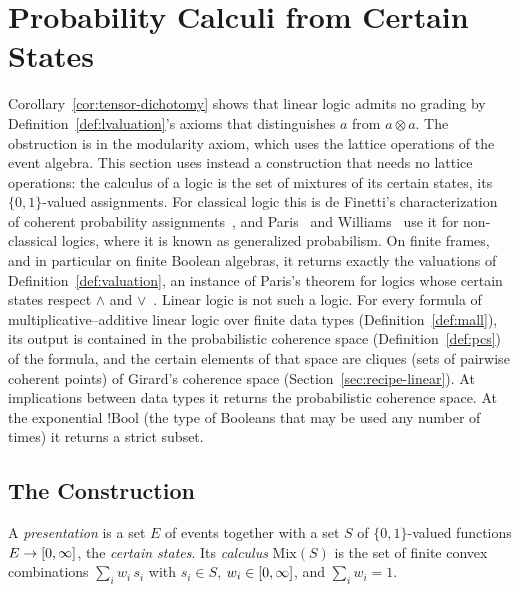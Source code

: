\section{Probability Calculi from Certain States}
\label{sec:recipe}

Corollary~\ref{cor:tensor-dichotomy} shows that linear logic admits no
grading by Definition~\ref{def:lvaluation}'s axioms that distinguishes
$a$ from $a \otimes a$. The obstruction is in the modularity axiom, which
uses the lattice operations of the event algebra. This section uses
instead a construction that needs no lattice operations: the calculus of
a logic is the set of mixtures of its certain states, its
$\{0,1\}$-valued assignments. For classical logic this is de Finetti's
characterization of coherent probability
assignments~\cite{definetti1974}, and Paris~\cite{paris2001} and
Williams~\cite{williams2012} use it for non-classical logics, where it is
known as generalized probabilism. On finite frames, and in particular on
finite Boolean algebras, it returns exactly the valuations of
Definition~\ref{def:valuation}, an instance of Paris's theorem for logics
whose certain states respect $\wedge$ and $\vee$~\cite{paris2001}.
Linear logic is not such a logic. For every formula of
multiplicative--additive linear logic over finite data types
(Definition~\ref{def:mall}), its output is contained in the
probabilistic coherence space (Definition~\ref{def:pcs}) of the formula,
and the certain elements of that space are cliques (sets of pairwise
coherent points) of Girard's coherence space
(Section~\ref{sec:recipe-linear}). At implications between data types it
returns the probabilistic coherence space. At the exponential
$!\mathrm{Bool}$ (the type of Booleans that may be used any number of
times) it returns a strict subset.

\subsection{The Construction}

\begin{definition}
\label{def:mix}
A \emph{presentation} is a set $E$ of events together with a set $S$ of
$\{0,1\}$-valued functions $E \to [0,\infty]$, the \emph{certain states}.
Its \emph{calculus} $\mathrm{Mix}(S)$ is the set of finite convex
combinations $\sum_{i} w_i\, s_i$ with $s_i \in S$, $w_i \in [0,\infty]$,
and $\sum_i w_i = 1$.
\end{definition}

